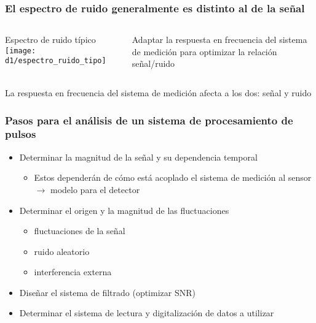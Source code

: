 \documentclass{beamer}
\begin{document}
\begin{frame}
\frametitle{\small{El espectro de ruido generalmente es distinto al de la
señal}}
\begin{columns}
\begin{column}{0.5\textwidth}
\begin{block}{\small{Espectro de ruido t\'ipico}}
\texttt{[image: d1/espectro\_ruido\_tipo]}
\end{block}
\end{column}
\begin{column}{0.48\textwidth}
\begin{alertblock}{}
Adaptar la respuesta en frecuencia del sistema de medici\'on para optimizar la
relaci\'on señal/ruido
\end{alertblock}
\end{column}
\end{columns}
\begin{block}{}
La respuesta en frecuencia del sistema de medici\'on \alert{afecta a los dos}: señal y
ruido
\end{block}
\end{frame} 

\begin{frame}
\frametitle{Pasos para el an\'alisis de un sistema de procesamiento de pulsos}
\begin{exampleblock}{}
\begin{itemize}
\item Determinar la magnitud de la señal y su dependencia temporal 
\begin{itemize}
\item Estos depender\'an de c\'omo est\'a acoplado el sistema de medici\'on al sensor
$\rightarrow$ \alert{modelo} para el detector
\end{itemize}
\item Determinar el origen y la magnitud de las fluctuaciones 
\begin{itemize}
\item fluctuaciones de la señal
\item ruido aleatorio
\item interferencia externa
\end{itemize}
\item Diseñar el sistema de filtrado (optimizar SNR)
\item Determinar el sistema de lectura y digitalizaci\'on de datos a utilizar
\end{itemize}
\end{exampleblock}
\end{frame} 
\end{document}
